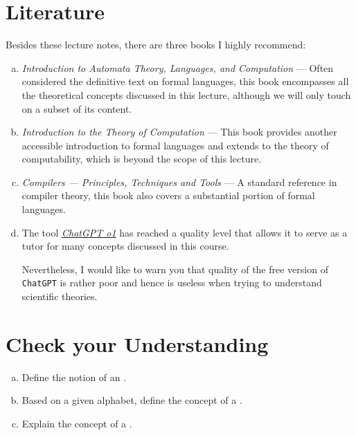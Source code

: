\section{Literature}
Besides these lecture notes, there are three books I highly recommend:
\begin{enumerate}[(a)]
\item \emph{Introduction to Automata Theory, Languages, and Computation} \cite{hopcroft:06}
      --- Often considered   the definitive text on formal languages, this book encompasses all the theoretical
      concepts discussed in this lecture, although we will only touch on a subset of its content. 
\item \emph{Introduction to the Theory of Computation} \cite{sipser:2012}
      --- This book provides another accessible introduction to formal languages and extends to the theory of
      computability, which is beyond the scope of this lecture. 
\item \emph{Compilers --- Principles, Techniques and Tools} \cite{aho:2006}
      --- A standard reference in compiler theory, this book also covers a substantial portion of formal languages.
\item The tool \href{https://chatgpt.com/?model=o1-preview/}{\emph{ChatGPT o1}} has reached a quality level
      that allows it to serve as a tutor for many concepts discussed in this course.

      Nevertheless, I would like to warn you that quality of the free version of \texttt{ChatGPT} is rather
      poor and hence is useless when trying to understand scientific theories.
\end{enumerate}

\section{Check your Understanding}
\begin{enumerate}[(a)]
\item Define the notion of an .
\item Based on a given alphabet, define the concept of a .
\item Explain the concept of a .
\end{enumerate}


